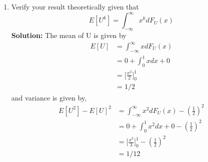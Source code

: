 \documentclass[journal,12pt,twocolumn]{IEEEtran}
\renewcommand\thesection{\arabic{section}}
\providecommand{\sbrak}[1]{\ensuremath{{}\left[#1\right]}}
\providecommand{\brak}[1]{\ensuremath{\left(#1\right)}}
\theoremstyle{remark}
\newcommand{\solution}{\noindent \textbf{Solution: }}
\numberwithin{equation}{section}
\begin{document}
\begin{enumerate}[label=\thesection.\arabic*
,ref=\thesection.\theenumi]
\solution Download and run the following C program.
\begin{lstlisting}
wget https://github.com/himanshukumargupta11012/Random-Numbers/blob/master/ques_1/1.4.c
\end{lstlisting}


\item Verify your result theoretically given that
\begin{equation}
	E\sbrak{U^k} = \int_{-\infty}^{\infty}x^kdF_{U}(x)
\end{equation}
\solution The mean of U is given by
\begin{align}
	E[U]&=\int_{-\infty}^{\infty}xdF_U(x)\\
	&=0+\int_{0}^{1}xdx+0\\
	&=\bigg[\frac{x^2}{2}\bigg]_0^1\\
	&=1/2
\end{align}
and variance is given by,
\begin{align}
	E[U^2]-E[U]^2&=\int_{-\infty}^{\infty}x^2dF_U(x)-\brak{\frac{1}{2}}^2\\
	&=0+\int_{0}^{1}x^2dx+0-\brak{\frac{1}{2}}^2\\
	&=\Bigg[\frac{x^2}{3}\Bigg]_0^1-\brak{\frac{1}{2}}^2\\
	&=1/12
\end{align}
\end{enumerate}
%
\end{document}

